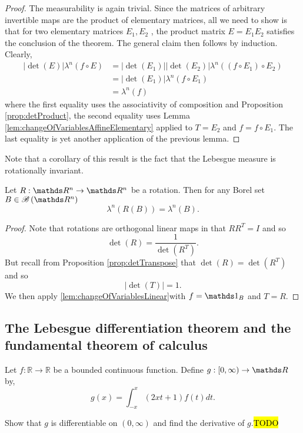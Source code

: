 \begin{proof}
The measurability is again trivial. Since the matrices of arbitrary
invertible maps are the product of elementary matrices, all we need
to show is that for two elementary matrices $E_{1},E_{2}$ , the product
matrix $E=E_{1}E_{2}$ satisfies the conclusion of the theorem. The
general claim then follows by induction. Clearly, 
\begin{align*}
\lvert\det\left(E\right)\rvert\lambda^{n}\left(f\circ E\right) & =\lvert\det\left(E_{1}\right)\rvert\lvert\det\left(E_{2}\right)\rvert\lambda^{n}\left(\left(f\circ E_{1}\right)\circ E_{2}\right)\\
 & =\lvert\det\left(E_{1}\right)\rvert\lambda^{n}\left(f\circ E_{1}\right)\\
 & =\lambda^{n}\left(f\right)
\end{align*}
where the first equality uses the associativity of composition and
Proposition \ref{prop:detProduct}, the second equality uses Lemma
\ref{lem:changeOfVariablesAffineElementary} applied to $T=E_{2}$
and $f=f\circ E_{1}$. The last equality is yet another application
of the previous lemma.
\end{proof}
Note that a corollary of this result is the fact that the Lebesgue
measure is rotationally invariant.
\begin{cor}
\label{cor:lebesgueRotationalInvariance}Let $R:\R^{n}\to\R^{n}$
be a rotation. Then for any Borel set $B\in\borel\left(\R^{n}\right)$
\[
\lambda^{n}\left(R\left(B\right)\right)=\lambda^{n}\left(B\right).
\]
\end{cor}

\begin{proof}
Note that rotations are orthogonal linear maps in that $RR^{T}=I$
and so 
\[
\det\left(R\right)=\frac{1}{\det\left(R^{T}\right)}.
\]
But recall from Proposition \ref{prop:detTranspose} that $\det\left(R\right)=\det\left(R^{T}\right)$
and so
\[
\lvert\det\left(T\right)\rvert=1.
\]
We then apply \ref{lem:changeOfVariablesLinear}with $f=\indicate_{B}$
and $T=R$.
\end{proof}

\subsection{The Lebesgue differentiation theorem and the fundamental theorem
of calculus}
\begin{example}
\label{exa:isi2007samplepsb4}Let $f:\mathbb{R}\rightarrow\mathbb{R}$
be a bounded continuous function. Define $g:[0,\infty)\rightarrow\R$
by, 
\[
g(x)=\int_{-x}^{x}(2xt+1)f(t)dt.
\]

Show that $g$ is differentiable on $(0,\infty)$ and find the derivative
of $g$.\hl{TODO}
\end{example}


